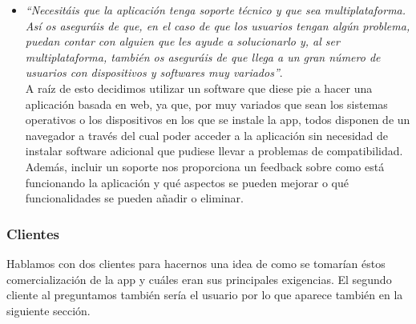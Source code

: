 \documentclass[12pt,a4paper]{article}
\begin{document}
\begin{itemize}
    \item \textit{``Necesitáis que la aplicación tenga soporte técnico y que sea multiplataforma. Así os aseguráis de que, en el caso de que los usuarios tengan algún problema, puedan contar con alguien que les ayude a solucionarlo y, al ser multiplataforma, también os aseguráis de que llega a un gran número de usuarios con dispositivos y softwares muy variados''}.\\
    
    A raíz de esto decidimos utilizar un software que diese pie a hacer una aplicación basada en web, ya que, por muy variados que sean los sistemas operativos o los dispositivos en los que se instale la app, todos disponen de un navegador a través del cual poder acceder a la aplicación sin necesidad de instalar software adicional que pudiese llevar a problemas de compatibilidad. Además, incluir un soporte nos proporciona un feedback sobre como está funcionando la aplicación y qué aspectos se pueden mejorar o qué funcionalidades se pueden añadir o eliminar.
\end{itemize}

\subsubsection{Clientes}
Hablamos con dos clientes para hacernos una idea de como se tomarían éstos comercialización de la app y cuáles eran sus principales exigencias. El segundo cliente al preguntamos también sería el usuario por lo que aparece también en la siguiente sección.
\end{document}
